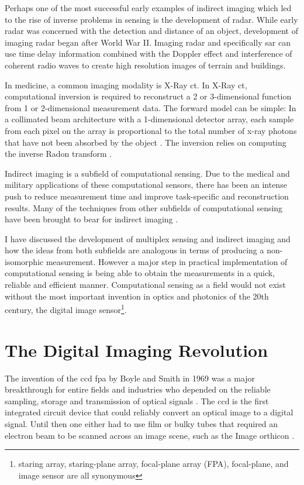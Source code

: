 Perhaps one of the most successful early examples of indirect imaging which led to the rise of inverse problems in sensing is the development of radar. While early radar was concerned with the detection and distance of an object, development of imaging radar began after World War II. Imaging radar and specifically \gls{sar} can use time delay information combined with the Doppler effect and interference of coherent radio waves to create high resolution images of terrain and buildings. 

In medicine, a common imaging modality is X-Ray \gls{ct}. In X-Ray \gls{ct}, computational inversion is required to reconstruct a 2 or 3-dimensional function from 1 or 2-dimensional measurement data. The forward model can be simple: In a collimated beam architecture with a 1-dimensional detector array, each sample from each pixel on the array is proportional to the total number of x-ray photons that have not been absorbed by the object \cite{radon20051}. The inversion relies on computing the inverse Radon transform \cite{nobelprize1979medicine}. 

Indirect imaging is a subfield of computational sensing. Due to the medical and military applications of these computational sensors, there has been an intense push to reduce measurement time and improve task-specific and reconstruction results. Many of the techniques from other subfields of computational sensing have been brought to bear for indirect imaging \cite{zhu2010tomographic, chen2012compressive}. 

I have discussed the development of multiplex sensing and indirect imaging and how the ideas from both subfields are analogous in terms of producing a non-isomorphic measurement. However a major step in practical implementation of computational sensing is being able to obtain the measurements in a quick, reliable and efficient manner. Computational sensing as a field would not exist without the most important invention in optics and photonics of the 20th century, the digital image sensor\footnote{ staring array, staring-plane array, focal-plane array (FPA), focal-plane, and image sensor are all synonymous }.

\section{The Digital Imaging Revolution}

The invention of the \gls{ccd} \gls{fpa} by Boyle and Smith in 1969 was a major breakthrough for entire fields and industries who depended on the reliable sampling, storage and transmission of optical signals \cite{boyle1970charge}. The \gls{ccd} is the first integrated circuit device that could reliably convert an optical image to a digital signal. Until then one either had to use film or bulky tubes that required an electron beam to be scanned across an image scene, such as the Image orthicon \cite{w1975image}. 

